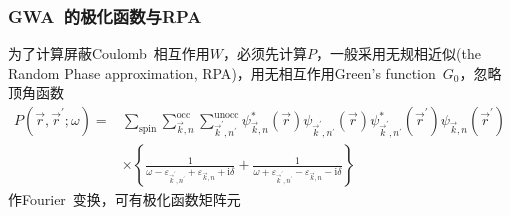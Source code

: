 \documentclass[cjk,slidestop,compress,mathserif,blue]{beamer}
\begin{document}
\frame
{
	\frametitle{\textrm{GWA~}的极化函数与\textrm{RPA}}
	为了计算屏蔽\textrm{Coulomb~}相互作用$W$，必须先计算$P$，一般采用无规相近似(\textrm{the Random Phase approximation, RPA})，用无相互作用\textrm{Green's function~}$G_0$，忽略顶角函数
	\begin{displaymath}
		\begin{aligned}
			P(\vec r,\vec r^{\prime};\omega)=&\sum_{\mathrm{spin}}\sum_{\vec k,n}^{\mathrm{occ}}\sum_{\vec k^{\prime},n^{\prime}}^{\mathrm{unocc}}\psi_{\vec k,n}^{\ast}(\vec r)\psi_{\vec k^{\prime},n^{\prime}}(\vec r)\psi_{\vec k^{\prime},n^{\prime}}^{\ast}(\vec r^{\prime})\psi_{\vec k,n}(\vec r^{\prime})\\
			&\times\left\{ \frac1{\omega-\varepsilon_{\vec k^{\prime},n^{\prime}}+\varepsilon_{\vec k,n}+\mathrm{i}\delta}+\frac1{\omega+\varepsilon_{\vec k^{\prime},n^{\prime}}-\varepsilon_{\vec k,n}-\mathrm{i}\delta} \right\}
		\end{aligned}
	\end{displaymath}
	作\textrm{Fourier~}变换，可有极化函数矩阵元
	\fontsize{7.5pt}{6.2pt}
}
\end{document}
